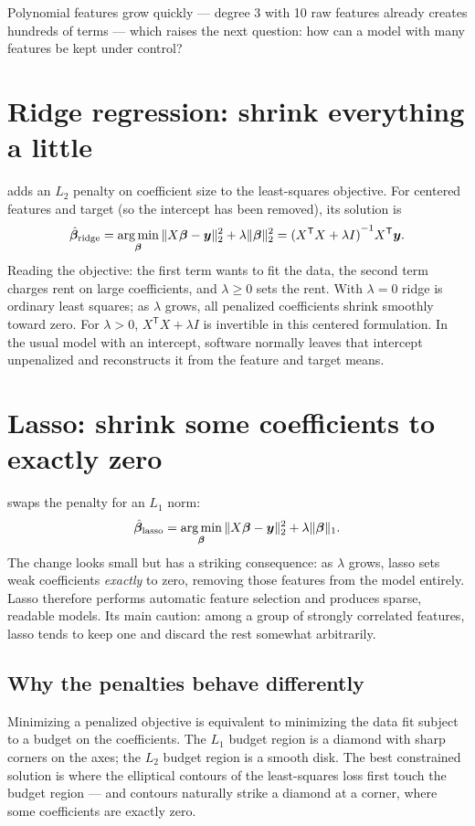 Polynomial features grow quickly --- degree 3 with 10 raw features already creates hundreds of terms --- which raises the next question: how can a model with many features be kept under control?

\section{Ridge regression: shrink everything a little}

 adds an $L_2$ penalty on coefficient size to the least-squares objective. For centered features and target (so the intercept has been removed), its solution is
\[
  \hat{\bm{\beta}}_{\mathrm{ridge}}
  =\operatorname*{arg\,min}_{\bm{\beta}}
  \|X\bm{\beta}-\bm{y}\|_2^2
  +\lambda\|\bm{\beta}\|_2^2
  ={(X^{\mathsf T}X+\lambda I)}^{-1}X^{\mathsf T}\bm{y}.
\]
Reading the objective: the first term wants to fit the data, the second term charges rent on large coefficients, and $\lambda\geq 0$ sets the rent. With $\lambda=0$ ridge is ordinary least squares; as $\lambda$ grows, all penalized coefficients shrink smoothly toward zero. For $\lambda>0$, $X^{\mathsf T}X+\lambda I$ is invertible in this centered formulation. In the usual model with an intercept, software normally leaves that intercept unpenalized and reconstructs it from the feature and target means.

\section{Lasso: shrink some coefficients to exactly zero}

 swaps the penalty for an $L_1$ norm:
\[
  \hat{\bm{\beta}}_{\mathrm{lasso}}
  =\operatorname*{arg\,min}_{\bm{\beta}}
  \|X\bm{\beta}-\bm{y}\|_2^2
  +\lambda\|\bm{\beta}\|_1.
\]
The change looks small but has a striking consequence: as $\lambda$ grows, lasso sets weak coefficients \emph{exactly} to zero, removing those features from the model entirely. Lasso therefore performs automatic feature selection and produces sparse, readable models. Its main caution: among a group of strongly correlated features, lasso tends to keep one and discard the rest somewhat arbitrarily.

\subsection{Why the penalties behave differently}

Minimizing a penalized objective is equivalent to minimizing the data fit subject to a budget on the coefficients. The $L_1$ budget region is a diamond with sharp corners on the axes; the $L_2$ budget region is a smooth disk. The best constrained solution is where the elliptical contours of the least-squares loss first touch the budget region --- and contours naturally strike a diamond at a corner, where some coefficients are exactly zero.


